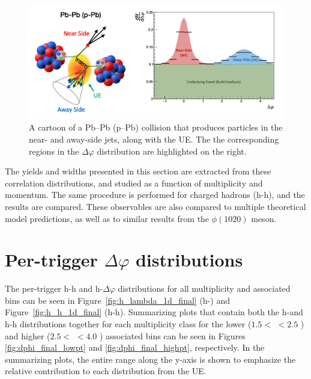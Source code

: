 \begin{figure}
\includegraphics[width=\textwidth]{figures/mnm/dphi_cartoon.png}
\caption{A cartoon of a Pb--Pb (p--Pb) collision that produces particles in the near- and away-side jets, along with the UE. The the corresponding regions in the $\Delta\varphi$ distribution are highlighted on the right.}
\label{fig:dphi_cartoon_ref}
\end{figure}

The yields and widths presented in this section are extracted from these correlation distributions, and studied as a function of multiplicity and \lmb momentum. The same procedure is performed for charged hadrons (h-h), and the results are compared. These observables are also compared to multiple theoretical model predictions, as well as to similar results from the $\phi(1020)$ meson.

\section{Per-trigger $\Delta\varphi$ distributions}

The per-trigger h-h and h-\lmb $\Delta\varphi$ distributions for all multiplicity and associated \pt bins can be seen in Figure~\ref{fig:h_lambda_1d_final} (h-\lmb) and Figure~\ref{fig:h_h_1d_final} (h-h). Summarizing plots that contain both the h-\lmb and h-h distributions together for each multiplicity class for the lower ($1.5 <$ \pt $< 2.5$ \GeVc) and higher ($2.5 < $ \pt $< 4.0$ \GeVc) associated \pt bins can be seen in Figures \ref{fig:dphi_final_lowpt} and \ref{fig:dphi_final_highpt}, respectively. In the summarizing plots, the entire range along the y-axis is shown to emphasize the relative contribution to each distribution from the UE. 

